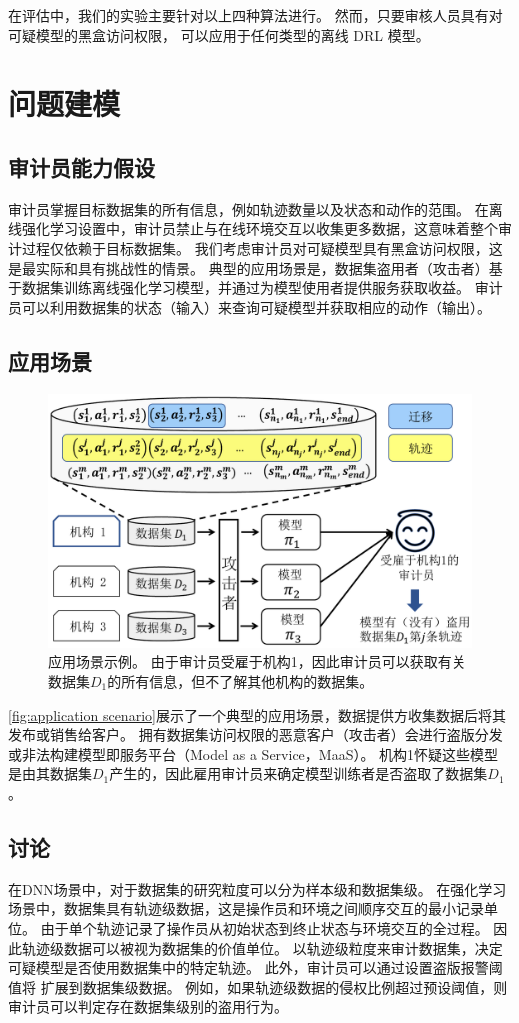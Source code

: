 在评估中，我们的实验主要针对以上四种算法进行。
然而，只要审核人员具有对可疑模型的黑盒访问权限，
\sysname 可以应用于任何类型的离线 DRL 模型。



\section{问题建模}
\label{sec:overview}
\subsection{审计员能力假设}
审计员掌握目标数据集的所有信息，例如轨迹数量以及状态和动作的范围。
在离线强化学习设置中，审计员禁止与在线环境交互以收集更多数据，这意味着整个审计过程仅依赖于目标数据集。
我们考虑审计员对可疑模型具有黑盒访问权限，这是最实际和具有挑战性的情景。
典型的应用场景是，数据集盗用者（攻击者）基于数据集训练离线强化学习模型，并通过为模型使用者提供服务获取收益。
审计员可以利用数据集的状态（输入）来查询可疑模型并获取相应的动作（输出）。

\subsection{应用场景}
\begin{figure}[!t]
    \centering
    \includegraphics[width=0.7\hsize]{figure/orl_auditor/system-v1ch.pdf}
    \caption{应用场景示例。
    由于审计员受雇于机构1，因此审计员可以获取有关数据集$D_1$的所有信息，但不了解其他机构的数据集。}
    \label{fig:application scenario}
\end{figure}
\autoref{fig:application scenario}展示了一个典型的应用场景，数据提供方收集数据后将其发布或销售给客户。
拥有数据集访问权限的恶意客户（攻击者）会进行盗版分发或非法构建模型即服务平台（Model as a Service，MaaS）。
机构1怀疑这些模型是由其数据集$D_1$产生的，因此雇用审计员来确定模型训练者是否盗取了数据集$D_1$。

\subsection{讨论}
在DNN场景中，对于数据集的研究粒度可以分为样本级和数据集级。
在强化学习场景中，数据集具有轨迹级数据，这是操作员和环境之间顺序交互的最小记录单位。
由于单个轨迹记录了操作员从初始状态到终止状态与环境交互的全过程。
因此轨迹级数据可以被视为数据集的价值单位。
\sysnameo 以轨迹级粒度来审计数据集，决定可疑模型是否使用数据集中的特定轨迹。
此外，审计员可以通过设置盗版报警阈值将 \sysnameo 扩展到数据集级数据。
例如，如果轨迹级数据的侵权比例超过预设阈值，则审计员可以判定存在数据集级别的盗用行为。


